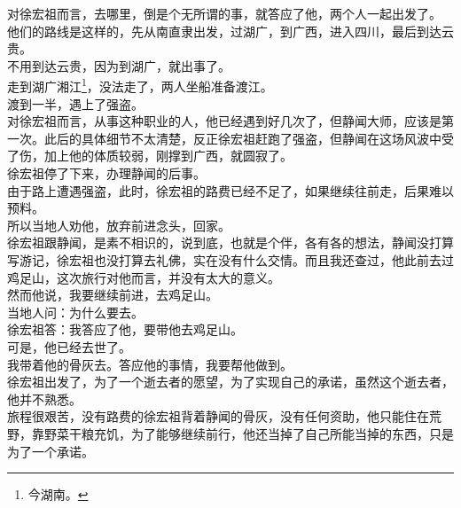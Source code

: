\begin{multicols}{\theparacolNo}
对徐宏祖而言，去哪里，倒是个无所谓的事，就答应了他，两个人一起出发了。\\

他们的路线是这样的，先从南直隶出发，过湖广，到广西，进入四川，最后到达云贵。\\

不用到达云贵，因为到湖广，就出事了。\\

走到湖广湘江\footnote{今湖南。}，没法走了，两人坐船准备渡江。\\

渡到一半，遇上了强盗。\\

对徐宏祖而言，从事这种职业的人，他已经遇到好几次了，但静闻大师，应该是第一次。此后的具体细节不太清楚，反正徐宏祖赶跑了强盗，但静闻在这场风波中受了伤，加上他的体质较弱，刚撑到广西，就圆寂了。\\

徐宏祖停了下来，办理静闻的后事。\\

由于路上遭遇强盗，此时，徐宏祖的路费已经不足了，如果继续往前走，后果难以预料。\\

所以当地人劝他，放弃前进念头，回家。\\

徐宏祖跟静闻，是素不相识的，说到底，也就是个伴，各有各的想法，静闻没打算写游记，徐宏祖也没打算去礼佛，实在没有什么交情。而且我还查过，他此前去过鸡足山，这次旅行对他而言，并没有太大的意义。\\

然而他说，我要继续前进，去鸡足山。\\

当地人问：为什么要去。\\

徐宏祖答：我答应了他，要带他去鸡足山。\\

可是，他已经去世了。\\

我带着他的骨灰去。答应他的事情，我要帮他做到。\\

徐宏祖出发了，为了一个逝去者的愿望，为了实现自己的承诺，虽然这个逝去者，他并不熟悉。\\

旅程很艰苦，没有路费的徐宏祖背着静闻的骨灰，没有任何资助，他只能住在荒野，靠野菜干粮充饥，为了能够继续前行，他还当掉了自己所能当掉的东西，只是为了一个承诺。\\


\end{multicols}
